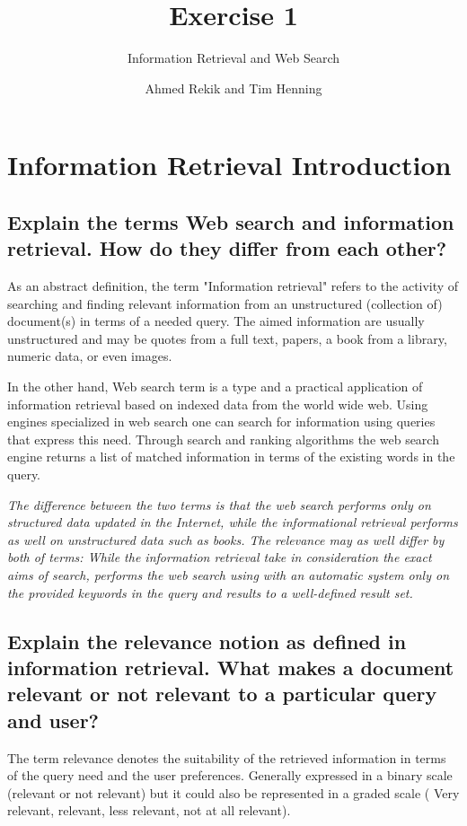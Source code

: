 \documentclass{scrartcl}
\title{Exercise 1}
\subtitle{Information Retrieval and Web Search}
\author{Ahmed Rekik and Tim Henning}
\begin{document}
\maketitle

\setcounter{section}{1}
\section{Information Retrieval Introduction}

\subsection{Explain the terms Web search and information retrieval. How do they differ from each
	other?}

As an abstract definition, the term  "Information retrieval" refers to the activity of searching and finding relevant information from an unstructured (collection of) document(s) in terms of a needed query. The aimed information are usually unstructured and may be quotes from a full text, papers, a book from a library, numeric data, or even images.

In the other hand, Web search term is a type and a practical application of information retrieval based on indexed data from the world wide web. Using engines specialized in web search one can search for information using queries that express this need. Through search and ranking algorithms the web search engine returns a list of matched information in terms of the existing words in the query.

\textit{The difference between the two terms is that the web search performs only on structured data updated in the Internet, while the informational retrieval performs as well on unstructured data such as books. The relevance may as well differ by both of terms: While the information retrieval take in consideration the exact aims of search, performs the web search using with an automatic system only on the provided keywords in the query and results to a well-defined result set.}

\subsection{Explain the relevance notion as defined in information retrieval. What makes a document
	relevant or not relevant to a particular query and user?}

The term relevance denotes the suitability of the retrieved information in terms of the query need and the user preferences. Generally expressed in a binary scale (relevant or not relevant) but it could also be represented in a graded scale ( Very relevant, relevant, less relevant, not at all relevant).
\end{document}
